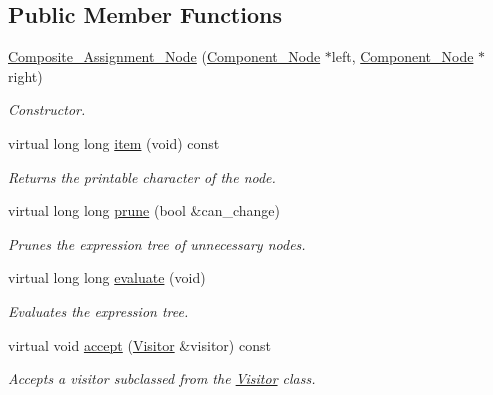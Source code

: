 \subsection*{Public Member Functions}
\begin{DoxyCompactItemize}
\item 
\hyperlink{classMadara_1_1Expression__Tree_1_1Composite__Assignment__Node_a387664864323deb108bf025c98caeeb6}{Composite\_\-Assignment\_\-Node} (\hyperlink{classMadara_1_1Expression__Tree_1_1Component__Node}{Component\_\-Node} $\ast$left, \hyperlink{classMadara_1_1Expression__Tree_1_1Component__Node}{Component\_\-Node} $\ast$right)
\begin{DoxyCompactList}\small\item\em Constructor. \item\end{DoxyCompactList}\item 
virtual long long \hyperlink{classMadara_1_1Expression__Tree_1_1Composite__Assignment__Node_a6b1db38d12994981379b862caa64b533}{item} (void) const 
\begin{DoxyCompactList}\small\item\em Returns the printable character of the node. \item\end{DoxyCompactList}\item 
virtual long long \hyperlink{classMadara_1_1Expression__Tree_1_1Composite__Assignment__Node_a58aad88460f030c8a58b365c211a2504}{prune} (bool \&can\_\-change)
\begin{DoxyCompactList}\small\item\em Prunes the expression tree of unnecessary nodes. \item\end{DoxyCompactList}\item 
virtual long long \hyperlink{classMadara_1_1Expression__Tree_1_1Composite__Assignment__Node_af6620ea1813001d26d3c3e21bc1287b1}{evaluate} (void)
\begin{DoxyCompactList}\small\item\em Evaluates the expression tree. \item\end{DoxyCompactList}\item 
virtual void \hyperlink{classMadara_1_1Expression__Tree_1_1Composite__Assignment__Node_a834155d24ce5366cfcfc943ced4e5df2}{accept} (\hyperlink{classMadara_1_1Expression__Tree_1_1Visitor}{Visitor} \&visitor) const 
\begin{DoxyCompactList}\small\item\em Accepts a visitor subclassed from the \hyperlink{classMadara_1_1Expression__Tree_1_1Visitor}{Visitor} class. \item\end{DoxyCompactList}\item 

\end{DoxyCompactItemize}
